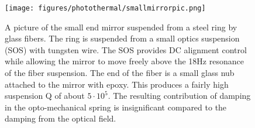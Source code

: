 \begin{figure}[htp]
\texttt{[image: figures/photothermal/smallmirrorpic.png]}%
\caption[End mirror picture]{A picture of the small end mirror suspended from a steel ring by glass fibers. The ring is suspended from a small optics suspension (SOS) with tungsten wire.
The SOS provides DC alignment control while allowing the mirror to move freely above the 18Hz resonance of the fiber suspension. The end of the fiber is a small glass nub attached to the mirror with epoxy. This produces a fairly high suspension Q of about $5 \cdot 10^5$. The resulting contribution of damping in the opto-mechanical spring is insignificant compared to the damping from the optical field.}%
\label{fig:smallmirrorpic}%
\end{figure}





